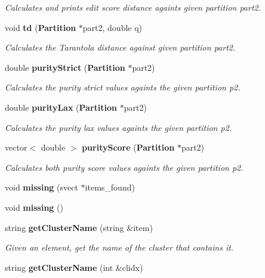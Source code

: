 \begin{CompactItemize}
\begin{CompactList}\small\item\em Calculates and prints edit score distance againts given partition part2. \item\end{CompactList}\item 
void {\bf td} ({\bf Partition} $\ast$part2, double q)\label{classPartition_a41}

\begin{CompactList}\small\item\em Calculates the Tarantola distance against given partition part2. \item\end{CompactList}\item 
double {\bf purity\-Strict} ({\bf Partition} $\ast$part2)\label{classPartition_a42}

\begin{CompactList}\small\item\em Calculates the purity strict values againts the given partition p2. \item\end{CompactList}\item 
double {\bf purity\-Lax} ({\bf Partition} $\ast$part2)\label{classPartition_a43}

\begin{CompactList}\small\item\em Calculates the purity lax values againts the given partition p2. \item\end{CompactList}\item 
vector$<$ double $>$ {\bf purity\-Score} ({\bf Partition} $\ast$part2)
\begin{CompactList}\small\item\em Calculates both purity score values againts the given partition p2. \item\end{CompactList}\item 
void {\bf missing} (svect $\ast$items\_\-found)\label{classPartition_a45}

\item 
void {\bf missing} ()\label{classPartition_a46}

\item 
string {\bf get\-Cluster\-Name} (string \&item)\label{classPartition_a47}

\begin{CompactList}\small\item\em Given an element, get the name of the cluster that contains it. \item\end{CompactList}\item 
string {\bf get\-Cluster\-Name} (int \&clidx)\label{classPartition_a48}


\end{CompactItemize}
